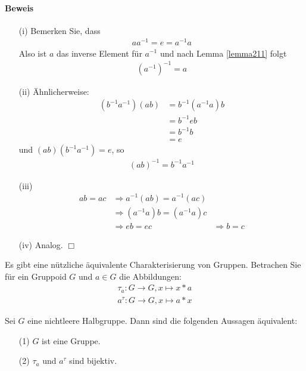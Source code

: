 \documentclass[11pt]{report}
\begin{document}
\paragraph{Beweis}
\begin{itemize}
 \item[(i)] Bemerken Sie, dass
\begin{align}
 aa^{-1} = e = a^{-1}a
\end{align}
Also ist $a$ das inverse Element für $a^{-1}$ und nach Lemma \ref{lemma211} folgt
\begin{align}
 (a^{-1})^{-1} = a
\end{align}
\item[(ii)] Ähnlicherweise:
\begin{align}
 (b^{-1}a^{-1})(ab) &= b^{-1}(a^{-1}a)b\\
                    &= b^{-1}eb \\
                    &= b^{-1}b \\
                    &= e
\end{align}
und $(ab)(b^{-1}a^{-1}) = e$, so
\begin{align}
 (ab)^{-1} = b^{-1}a^{-1}
\end{align}

\item[(iii)]
\begin{align}
ab = ac &\Rightarrow a^{-1}(ab) = a^{-1}(ac) \\
        &\Rightarrow (a^{-1}a)b = (a^{-1}a)c \\
        &\Rightarrow eb = ec
        &\Rightarrow b = c
\end{align}

\item[(iv)] Analog. \hfill $\Box$
\end{itemize}
Es gibt eine nützliche äquivalente Charakterisierung von Gruppen. Betrachen Sie für ein Gruppoid $G$ und $a \in G$ die Abbildungen:
\begin{align}
 \tau_a : G \rightarrow G, x \mapsto x*a \\
 a^{\tau}: G \rightarrow G, x \mapsto a*x
\end{align}

\begin{lemma}
\label{lemma213}
 Sei $G$ eine nichtleere Halbgruppe. Dann sind die folgenden Aussagen äquivalent:
\begin{itemize}
 \item[(1)] $G$ ist eine Gruppe.
 \item[(2)] $\tau_a$ und $a^{\tau}$ sind bijektiv.
\end{itemize}
\end{lemma}
\end{document}
